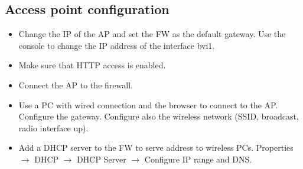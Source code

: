 \subsection{Access point configuration}
\begin{itemize}
\item Change the IP of the AP and set the FW as the default gateway. Use the console to change the IP address of the interface bvi1.
\item Make sure that HTTP access is enabled.
\item Connect the AP to the firewall.
\item Use a PC with wired connection and the browser to connect to the AP. Configure the gateway. Configure also the wireless network (SSID, broadcast, radio interface up).
\item Add a DHCP server to the FW to serve address to wireless PCs. Properties $\rightarrow$ DHCP $\rightarrow$ DHCP Server $\rightarrow$ Configure IP range and DNS.
\end{itemize}

